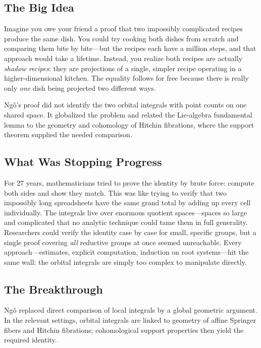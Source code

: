 \subsection{The Big Idea}

Imagine you owe your friend a proof that two impossibly complicated recipes produce the same dish. You could try cooking both dishes from scratch and comparing them bite by bite---but the recipes each have a million steps, and that approach would take a lifetime. Instead, you realize both recipes are actually \emph{shadow recipes}: they are projections of a single, simpler recipe operating in a higher-dimensional kitchen. The equality follows for free because there is really only \emph{one} dish being projected two different ways.

Ngô's proof did not identify the two orbital integrals with point counts on one shared space. It globalized the problem and related the Lie-algebra fundamental lemma to the geometry and cohomology of Hitchin fibrations, where the support theorem supplied the needed comparison.

\subsection{What Was Stopping Progress}

For 27 years, mathematicians tried to prove the identity by brute force: compute both sides and show they match. This was like trying to verify that two impossibly long spreadsheets have the same grand total by adding up every cell individually. The integrals live over enormous quotient spaces---spaces so large and complicated that no analytic technique could tame them in full generality. Researchers could verify the identity case by case for small, specific groups, but a single proof covering \emph{all} reductive groups at once seemed unreachable. Every approach---estimates, explicit computation, induction on root systems---hit the same wall: the orbital integrals are simply too complex to manipulate directly.

\subsection{The Breakthrough}

Ngô replaced direct comparison of local integrals by a global geometric argument. In the relevant settings, orbital integrals are linked to geometry of affine Springer fibers and Hitchin fibrations; cohomological support properties then yield the required identity.

